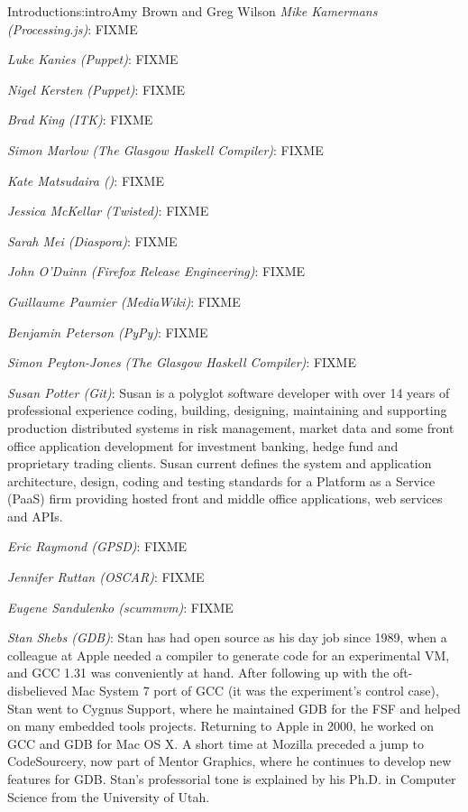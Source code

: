 \begin{aosachapter}{Introduction}{s:intro}{Amy Brown and Greg Wilson}
\emph{Mike Kamermans (Processing.js)}: FIXME

\emph{Luke Kanies (Puppet)}: FIXME

\emph{Nigel Kersten (Puppet)}: FIXME

\emph{Brad King (ITK)}: FIXME

\emph{Simon Marlow (The Glasgow Haskell Compiler)}: FIXME

\emph{Kate Matsudaira ()}: FIXME

\emph{Jessica McKellar (Twisted)}: FIXME

\emph{Sarah Mei (Diaspora)}: FIXME

\emph{John O'Duinn (Firefox Release Engineering)}: FIXME

\emph{Guillaume Paumier (MediaWiki)}: FIXME

\emph{Benjamin Peterson (PyPy)}: FIXME

\emph{Simon Peyton-Jones (The Glasgow Haskell Compiler)}: FIXME

\emph{Susan Potter (Git)}: Susan is a polyglot software developer with
over 14 years of professional experience coding, building, designing,
maintaining and supporting production distributed systems in risk management,
market data and some front office application development for investment
banking, hedge fund and proprietary trading clients. Susan current defines the
system and application architecture, design, coding and testing standards for
a Platform as a Service (PaaS) firm providing hosted front and middle office
applications, web services and APIs.

\emph{Eric Raymond (GPSD)}: FIXME

\emph{Jennifer Ruttan (OSCAR)}: FIXME

\emph{Eugene Sandulenko (scummvm)}: FIXME

\emph{Stan Shebs (GDB)}: Stan has had open source as his day job since
1989, when a colleague at Apple needed a compiler to generate code for
an experimental VM, and GCC 1.31 was conveniently at hand.  After
following up with the oft-disbelieved Mac System 7 port of GCC (it was
the experiment's control case), Stan went to Cygnus Support, where he
maintained GDB for the FSF and helped on many embedded tools projects.
Returning to Apple in 2000, he worked on GCC and GDB for Mac OS X.  A
short time at Mozilla preceded a jump to CodeSourcery, now part of
Mentor Graphics, where he continues to develop new features for GDB.
Stan's professorial tone is explained by his Ph.D. in Computer Science
from the University of Utah.


\end{aosachapter}
